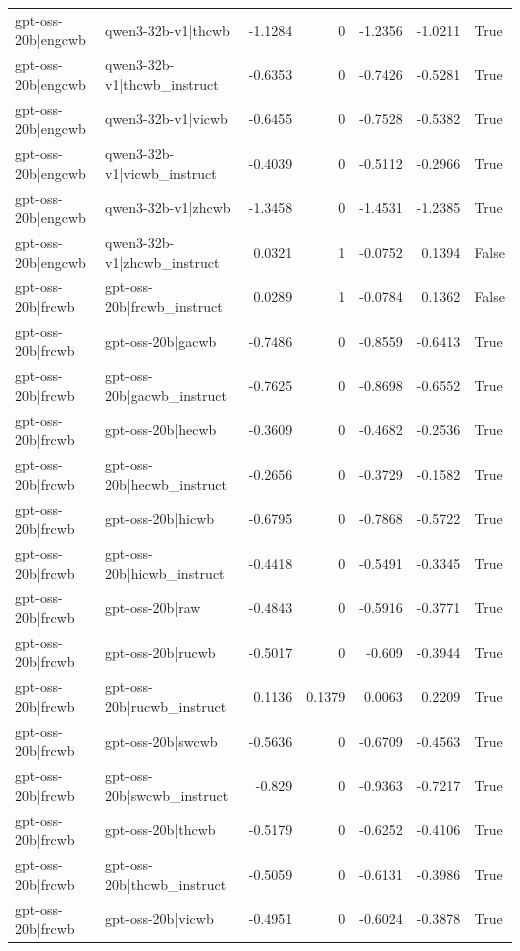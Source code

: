 \begin{table}
\begin{tabular}{l l r r r r l}
gpt-oss-20b|engcwb & qwen3-32b-v1|thcwb & -1.1284 & 0 & -1.2356 & -1.0211 & True \\
gpt-oss-20b|engcwb & qwen3-32b-v1|thcwb_instruct & -0.6353 & 0 & -0.7426 & -0.5281 & True \\
gpt-oss-20b|engcwb & qwen3-32b-v1|vicwb & -0.6455 & 0 & -0.7528 & -0.5382 & True \\
gpt-oss-20b|engcwb & qwen3-32b-v1|vicwb_instruct & -0.4039 & 0 & -0.5112 & -0.2966 & True \\
gpt-oss-20b|engcwb & qwen3-32b-v1|zhcwb & -1.3458 & 0 & -1.4531 & -1.2385 & True \\
gpt-oss-20b|engcwb & qwen3-32b-v1|zhcwb_instruct & 0.0321 & 1 & -0.0752 & 0.1394 & False \\
gpt-oss-20b|frcwb & gpt-oss-20b|frcwb_instruct & 0.0289 & 1 & -0.0784 & 0.1362 & False \\
gpt-oss-20b|frcwb & gpt-oss-20b|gacwb & -0.7486 & 0 & -0.8559 & -0.6413 & True \\
gpt-oss-20b|frcwb & gpt-oss-20b|gacwb_instruct & -0.7625 & 0 & -0.8698 & -0.6552 & True \\
gpt-oss-20b|frcwb & gpt-oss-20b|hecwb & -0.3609 & 0 & -0.4682 & -0.2536 & True \\
gpt-oss-20b|frcwb & gpt-oss-20b|hecwb_instruct & -0.2656 & 0 & -0.3729 & -0.1582 & True \\
gpt-oss-20b|frcwb & gpt-oss-20b|hicwb & -0.6795 & 0 & -0.7868 & -0.5722 & True \\
gpt-oss-20b|frcwb & gpt-oss-20b|hicwb_instruct & -0.4418 & 0 & -0.5491 & -0.3345 & True \\
gpt-oss-20b|frcwb & gpt-oss-20b|raw & -0.4843 & 0 & -0.5916 & -0.3771 & True \\
gpt-oss-20b|frcwb & gpt-oss-20b|rucwb & -0.5017 & 0 & -0.609 & -0.3944 & True \\
gpt-oss-20b|frcwb & gpt-oss-20b|rucwb_instruct & 0.1136 & 0.1379 & 0.0063 & 0.2209 & True \\
gpt-oss-20b|frcwb & gpt-oss-20b|swcwb & -0.5636 & 0 & -0.6709 & -0.4563 & True \\
gpt-oss-20b|frcwb & gpt-oss-20b|swcwb_instruct & -0.829 & 0 & -0.9363 & -0.7217 & True \\
gpt-oss-20b|frcwb & gpt-oss-20b|thcwb & -0.5179 & 0 & -0.6252 & -0.4106 & True \\
gpt-oss-20b|frcwb & gpt-oss-20b|thcwb_instruct & -0.5059 & 0 & -0.6131 & -0.3986 & True \\
gpt-oss-20b|frcwb & gpt-oss-20b|vicwb & -0.4951 & 0 & -0.6024 & -0.3878 & True \\

\end{tabular}
\end{table}
